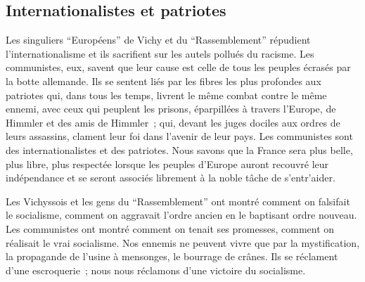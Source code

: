 \documentclass[french,twoside]{book} %
\begin{document}
\subsection[Internationalistes et patriotes]{Internationalistes et patriotes}
\noindent Les singuliers “Européens” de Vichy et du “Rassemblement” répudient l’internationalisme et ils sacrifient sur les autels pollués du racisme. Les communistes, eux, savent que leur cause est celle de tous les peuples écrasés par la botte allemande. Ils se sentent liés par les fibres les plus profondes aux patriotes qui, dans tous les temps, livrent le même combat contre le même ennemi, avec ceux qui peuplent les prisons, éparpillées à travers l’Europe, de Himmler et des amis de Himmler ; qui, devant les juges dociles aux ordres de leurs assassins, clament leur foi dans l’avenir de leur pays. Les communistes sont des internationalistes et des patriotes. Nous savons que la France sera plus belle, plus libre, plus respectée lorsque les peuples d’Europe auront recouvré leur indépendance et se seront associés librement à la noble tâche de s’entr’aider.\par
Les Vichyssois et les gens du “Rassemblement” ont montré comment on falsifait le socialisme, comment on aggravait l’ordre ancien en le baptisant ordre nouveau. Les communistes ont montré comment on tenait ses promesses, comment on réalisait le vrai socialisme. Nos ennemis ne peuvent vivre que par la mystification, la propagande de l’usine à mensonges, le bourrage de crânes. Ils se réclament d’une escroquerie ; nous nous réclamons d’une victoire du socialisme.
\end{document}
